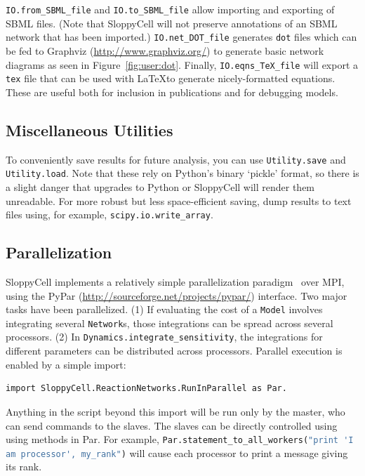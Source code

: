 \documentclass[12pt]{article}
\makeatletter
\newcommand{\py}[1]{\lstinline[language=Python, showstringspaces=False]@#1@}
\newcommand{\shell}[1]{\lstinline[language=csh, showstringspaces=False]!#1!}
\makeatother
\begin{document}
\py{IO.from_SBML_file} and \py{IO.to_SBML_file} allow importing and exporting of SBML files. (Note that SloppyCell will not preserve annotations of an SBML network that has been imported.)
\py{IO.net_DOT_file} generates \shell{dot} files which can be fed to Graphviz (\url{http://www.graphviz.org/}) to generate basic network diagrams as seen in Figure~\ref{fig:user:dot}.
Finally, \py{IO.eqns_TeX_file} will export a \shell{tex} file that can be used with \LaTeX to generate nicely-formatted equations. These are useful both for inclusion in publications and for debugging models.

\subsection{Miscellaneous Utilities}

To conveniently save results for future analysis, you can use \py{Utility.save} and \py{Utility.load}.
Note that these rely on Python's binary `pickle' format, so there is a slight danger that upgrades to Python or SloppyCell will render them unreadable. For more robust but less space-efficient saving, dump results to text files using, for example, \py{scipy.io.write_array}.

\subsection{Parallelization\label{sec:user:parallel}}

SloppyCell implements a relatively simple parallelization paradigm~\cite{bib:Myers2007} over MPI, using the PyPar (\url{http://sourceforge.net/projects/pypar/}) interface.
Two major tasks have been parallelized.
(1) If evaluating the cost of a \py{Model} involves integrating several \py{Network}s, those integrations can be spread across several processors.
(2) In \py{Dynamics.integrate_sensitivity}, the integrations for different parameters can be distributed across processors.
Parallel execution is enabled by a simple import:
\begin{lstlisting}
import SloppyCell.ReactionNetworks.RunInParallel as Par.
\end{lstlisting}
Anything in the script beyond this import will be run only by the master, who can send commands to the slaves. 
The slaves can be directly controlled using using methods in Par.
For example, \py{Par.statement_to_all_workers("print 'I am processor', my_rank")} will cause each processor to print a message giving its rank.
\end{document}
